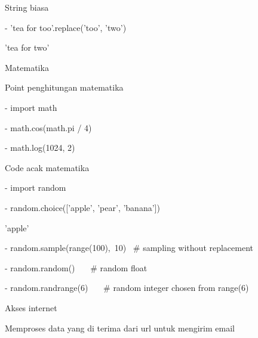 {{{{{{{{{{{{{\noindent 
String biasa \par
\vspace{\baselineskip}
\noindent 
- 'tea for too'.replace('too', 'two') \par
\vspace{\baselineskip}
\noindent 
'tea for two' \par
\vspace{\baselineskip}
\noindent 
Matematika  \par
\vspace{\baselineskip}
\noindent 
Point penghitungan matematika \par
\vspace{\baselineskip}
\noindent 
- import math \par
\vspace{\baselineskip}
\noindent 
- math.cos(math.pi / 4) \par
\vspace{\baselineskip}
 \par
\vspace{\baselineskip}
\noindent 
- math.log(1024, 2) \par
\vspace{\baselineskip}
 \par
\vspace{\baselineskip}
\noindent 
Code acak matematika \par
\vspace{\baselineskip}
\noindent 
- import random \par
\vspace{\baselineskip}
\noindent 
- random.choice(['apple', 'pear', 'banana']) \par
\vspace{\baselineskip}
\noindent 
'apple' \par
\vspace{\baselineskip}
\noindent 
- random.sample(range(100),~10)~   $  \#  $ sampling without replacement \par
\vspace{\baselineskip}
\noindent 
[30, 83, 16, 4, 8, 81, 41, 50, 18, 33] \par
\vspace{\baselineskip}
\noindent 
- random.random()~~~  $  \#  $ random float \par
\vspace{\baselineskip}
 \par
\vspace{\baselineskip}
\noindent 
- random.randrange(6)~~~  $  \#  $ random integer chosen from range(6) \par
\vspace{\baselineskip}
 \par
\vspace{\baselineskip}
\noindent 
Akses internet \par
\vspace{\baselineskip}
\noindent 
Memproses data yang di terima dari url untuk mengirim email \par
\vspace{\baselineskip}

}}}}}}}}}}}}}

